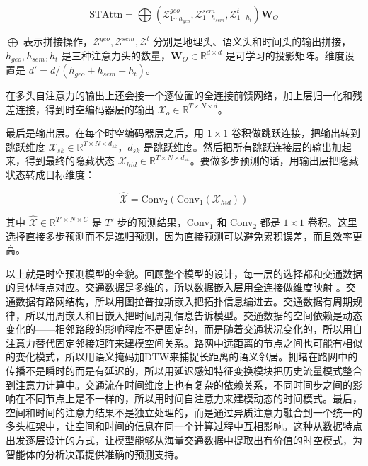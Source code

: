 \begin{equation}
\text{STAttn} = \bigoplus(\mathcal{Z}_{1\cdots h_{geo}}^{geo}, \mathcal{Z}_{1\cdots h_{sem}}^{sem}, \mathcal{Z}_{1\cdots h_{t}}^{t}) \boldsymbol{W}_O
\end{equation}

$\bigoplus$ 表示拼接操作，$\mathcal{Z}^{geo}, \mathcal{Z}^{sem}, \mathcal{Z}^{t}$ 分别是地理头、语义头和时间头的输出拼接，$h_{geo}, h_{sem}, h_t$ 是三种注意力头的数量，$\boldsymbol{W}_O \in \mathbb{R}^{d \times d}$ 是可学习的投影矩阵。维度设置是 $d' = d / (h_{geo} + h_{sem} + h_t)$。

在多头自注意力的输出上还会接一个逐位置的全连接前馈网络，加上层归一化和残差连接，得到时空编码器层的输出 $\mathcal{X}_o \in \mathbb{R}^{T \times N \times d}$。

最后是输出层。在每个时空编码器层之后，用 $1 \times 1$ 卷积做跳跃连接，把输出转到跳跃维度 $\mathcal{X}_{sk} \in \mathbb{R}^{T \times N \times d_{sk}}$，$d_{sk}$ 是跳跃维度。然后把所有跳跃连接层的输出加起来，得到最终的隐藏状态 $\mathcal{X}_{hid} \in \mathbb{R}^{T \times N \times d_{sk}}$。要做多步预测的话，用输出层把隐藏状态转成目标维度：

\begin{equation}
\hat{\mathcal{X}} = \text{Conv}_2(\text{Conv}_1(\mathcal{X}_{hid}))
\end{equation}

其中 $\hat{\mathcal{X}} \in \mathbb{R}^{T' \times N \times C}$ 是 $T'$ 步的预测结果，$\text{Conv}_1$ 和 $\text{Conv}_2$ 都是 $1 \times 1$ 卷积。这里选择直接多步预测而不是递归预测，因为直接预测可以避免累积误差，而且效率更高。

以上就是时空预测模型的全貌。回顾整个模型的设计，每一层的选择都和交通数据的具体特点对应。交通数据是多维的，所以数据嵌入层用全连接做维度映射 。交通数据有路网结构，所以用图拉普拉斯嵌入把拓扑信息编进去。交通数据有周期规律，所以用周嵌入和日嵌入把时间周期信息告诉模型。交通数据的空间依赖是动态变化的——相邻路段的影响程度不是固定的，而是随着交通状况变化的，所以用自注意力替代固定邻接矩阵来建模空间关系。路网中远距离的节点之间也可能有相似的变化模式，所以用语义掩码加DTW来捕捉长距离的语义邻居。拥堵在路网中的传播不是瞬时的而是有延迟的，所以用延迟感知特征变换模块把历史流量模式整合到注意力计算中。交通流在时间维度上也有复杂的依赖关系，不同时间步之间的影响在不同节点上是不一样的，所以用时间自注意力来建模动态的时间模式。最后，空间和时间的注意力结果不是独立处理的，而是通过异质注意力融合到一个统一的多头框架中，让空间和时间的信息在同一个计算过程中互相影响。这种从数据特点出发逐层设计的方式，让模型能够从海量交通数据中提取出有价值的时空模式，为智能体的分析决策提供准确的预测支持。

